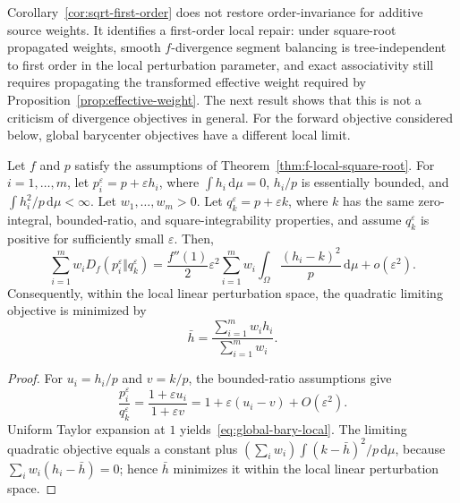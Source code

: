 \documentclass[runningheads]{llncs}
\newcommand{\dd}{\,\mathrm{d}}
\begin{document}
Corollary~\ref{cor:sqrt-first-order} does not restore order-invariance for
additive source weights. It identifies a first-order local repair: under square-root propagated weights, smooth $f$-divergence segment balancing is tree-independent to first order in the local perturbation parameter, and exact associativity still requires propagating the transformed effective weight required by Proposition~\ref{prop:effective-weight}. The next result
shows that this is not a criticism of divergence objectives in general. For the forward objective considered below, global barycenter objectives have a different local limit.

\begin{proposition}
\label{prop:global-barycenter-local}
Let $f$ and $p$ satisfy the assumptions of
Theorem~\ref{thm:f-local-square-root}. For $i=1,\ldots,m$, let
$p_i^\varepsilon=p+\varepsilon h_i$, where $\int h_i\dd\mu=0$, $h_i/p$
is essentially bounded, and $\int h_i^2/p\dd\mu<\infty$. Let
$w_1,\ldots,w_m>0$. Let
$q_k^\varepsilon=p+\varepsilon k$, where $k$ has the same zero-integral,
bounded-ratio, and square-integrability properties, and assume
$q_k^\varepsilon$ is positive for sufficiently small $\varepsilon$. Then,
\begin{equation}
  \sum_{i=1}^m w_iD_f(p_i^\varepsilon\Vert q_k^\varepsilon)
    = \frac{f''(1)}{2}\varepsilon^2
  \sum_{i=1}^m w_i\int_\Omega\frac{(h_i-k)^2}{p}\dd\mu
  +o(\varepsilon^2).
  \label{eq:global-bary-local}
\end{equation}
Consequently, within the local linear perturbation space, the quadratic limiting objective is minimized by
\begin{equation}
  \bar h=\frac{\sum_{i=1}^m w_i h_i}{\sum_{i=1}^m w_i}.
  \label{eq:additive-bary-perturbation}
\end{equation}
\end{proposition}

\begin{proof}
For $u_i=h_i/p$ and $v=k/p$, the bounded-ratio assumptions give
\begin{equation*}
\frac{p_i^\varepsilon}{q_k^\varepsilon}=\frac{1+\varepsilon u_i}{1+\varepsilon v}=1+\varepsilon(u_i-v)+O(\varepsilon^2).
\end{equation*}
Uniform Taylor expansion at $1$ yields~\eqref{eq:global-bary-local}. The limiting quadratic objective equals a constant plus $(\sum_iw_i)\int (k-\bar h)^2/p\dd\mu$, because $\sum_iw_i(h_i-\bar h)=0$; hence $\bar h$ minimizes it within the local linear perturbation space.
\end{proof}
\end{document}

